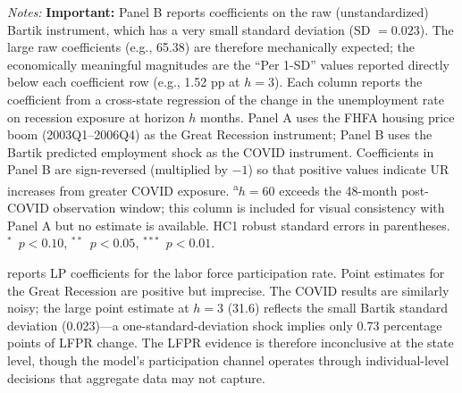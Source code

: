\documentclass[12pt]{article}
\begin{document}
\begin{table}[H]
\begin{threeparttable}
\begin{tablenotes}[flushleft]
\item \textit{Notes:} \textbf{Important:} Panel B reports coefficients on the raw (unstandardized) Bartik instrument, which has a very small standard deviation (SD $= 0.023$). The large raw coefficients (e.g., 65.38) are therefore mechanically expected; the economically meaningful magnitudes are the ``Per 1-SD'' values reported directly below each coefficient row (e.g., 1.52 pp at $h=3$). Each column reports the coefficient from a cross-state regression of the change in the unemployment rate on recession exposure at horizon $h$ months. Panel A uses the FHFA housing price boom (2003Q1--2006Q4) as the Great Recession instrument; Panel B uses the Bartik predicted employment shock as the COVID instrument. Coefficients in Panel B are sign-reversed (multiplied by $-1$) so that positive values indicate UR increases from greater COVID exposure. \textsuperscript{a}$h=60$ exceeds the 48-month post-COVID observation window; this column is included for visual consistency with Panel A but no estimate is available. HC1 robust standard errors in parentheses. $^{*}$~$p<0.10$, $^{**}$~$p<0.05$, $^{***}$~$p<0.01$.
\end{tablenotes}
\end{threeparttable}
\end{table}

 reports LP coefficients for the labor force participation rate. Point estimates for the Great Recession are positive but imprecise. The COVID results are similarly noisy; the large point estimate at $h=3$ (31.6) reflects the small Bartik standard deviation (0.023)---a one-standard-deviation shock implies only 0.73 percentage points of LFPR change. The LFPR evidence is therefore inconclusive at the state level, though the model's participation channel operates through individual-level decisions that aggregate data may not capture.
\end{document}
